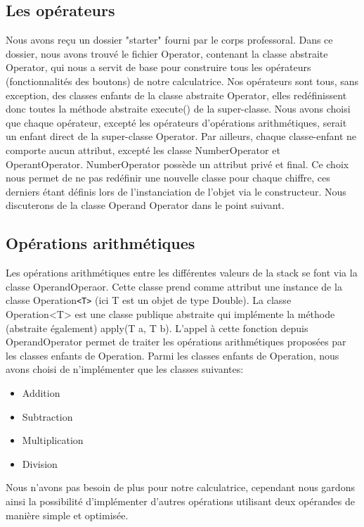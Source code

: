 \documentclass[12pt]{report}
\begin{document}
        \subsection*{Les opérateurs}
            Nous avons reçu un dossier "starter" fourni par le corps professoral. Dans ce dossier, nous avons trouvé le
    fichier Operator, contenant la classe abstraite Operator, qui nous a servit de base pour construire tous les opérateurs (fonctionnalités des boutons) de notre
    calculatrice.
    \newline Nos opérateurs sont tous, sans exception, des classes enfants de la classe abstraite Operator, elles redéfinissent
    donc toutes la méthode abstraite execute() de la super-classe.
    Nous avons choisi que chaque opérateur, excepté les opérateurs d'opérations arithmétiques, serait un enfant direct de la
    super-classe Operator.
    \newline
    Par ailleurs, chaque classe-enfant ne comporte aucun attribut, excepté les classe NumberOperator et OperantOperator.
    NumberOperator possède un attribut privé et final. Ce choix nous permet de ne pas redéfinir une nouvelle classe pour chaque
    chiffre, ces derniers étant définis lors de l'instanciation de l'objet via le constructeur.
    \newline Nous discuterons de la classe Operand Operator dans le point suivant.

        \subsection*{Opérations arithmétiques}
            Les opérations arithmétiques entre les différentes valeurs de la stack se font via la classe OperandOperaor.
    \newline Cette classe prend comme attribut une instance de la classe Operation\verb|<T>| (ici T est un objet de type Double).
    La classe Operation<T> est une classe publique abstraite qui implémente la méthode (abstraite également) apply(T a, T b).
    L'appel à cette fonction depuis OperandOperator permet de traiter les opérations arithmétiques proposées par les classes
    enfants de Operation.
    \newline Parmi les classes enfants de Operation, nous avons choisi de n'implémenter que les classes suivantes:
    \begin{itemize}
        \item Addition
        \item Subtraction
        \item Multiplication
        \item Division
    \end{itemize}
    Nous n'avons pas besoin de plus pour notre calculatrice, cependant nous gardons ainsi la possibilité d'implémenter d'autres
    opérations utilisant deux opérandes de manière simple et optimisée.
\end{document}
